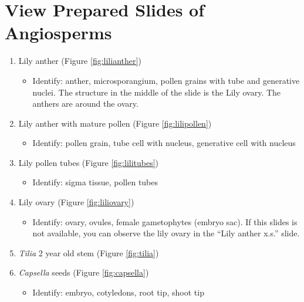 \section{View Prepared Slides of
Angiosperms}\label{view-prepared-slides-of-angiosperms}

\begin{enumerate}
\def\labelenumi{\arabic{enumi}.}
\tightlist
\item
  Lily anther (Figure \ref{fig:lilianther})

  \begin{itemize}
  \tightlist
  \item
    Identify: anther, microsporangium, pollen grains with tube and
    generative nuclei. The structure in the middle of the slide is the
    Lily ovary. The anthers are around the ovary.
  \end{itemize}
\item
  Lily anther with mature pollen (Figure \ref{fig:lilipollen})

  \begin{itemize}
  \tightlist
  \item
    Identify: pollen grain, tube cell with nucleus, generative cell with
    nucleus
  \end{itemize}
\item
  Lily pollen tubes (Figure \ref{fig:lilitubes})

  \begin{itemize}
  \tightlist
  \item
    Identify: sigma tissue, pollen tubes
  \end{itemize}
\item
  Lily ovary (Figure \ref{fig:liliovary})

  \begin{itemize}
  \tightlist
  \item
    Identify: ovary, ovules, female gametophytes (embryo sac). If this
    slides is not available, you can observe the lily ovary in the
    ``Lily anther x.s.'' slide.
  \end{itemize}
\item
  \emph{Tilia} 2 year old stem (Figure \ref{fig:tilia})
\item
  \emph{Capsella} seeds (Figure \ref{fig:capsella})

  \begin{itemize}
  \tightlist
  \item
    Identify: embryo, cotyledons, root tip, shoot tip
  \end{itemize}
\end{enumerate}


